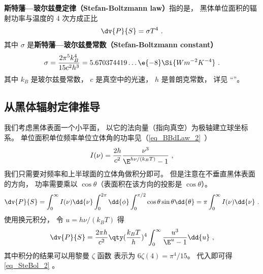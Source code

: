
\textbf{斯特藩—玻尔兹曼定律（Stefan-Boltzmann law）}指的是， 黑体单位面积的辐射功率与温度的 4 次方成正比
\begin{equation}\label{eq_SteBol_2}
\dv{P}{S} = \sigma T^4~.
\end{equation}
其中 $\sigma$ 是\textbf{斯特藩—玻尔兹曼常数（Stefan-Boltzmann constant）}
\begin{equation}
\sigma = \frac{2\pi^5k_B^4}{15c^2h^3} = 5.670374419\dots \e{-8} \Si{Wm^{-2}K^{-4}}~.
\end{equation}
其中 $k_B$ 是玻尔兹曼常数， $c$ 是真空中的光速， $h$ 是普朗克常数， 详见 “”。

\subsection{从黑体辐射定律推导}

我们考虑黑体表面一个小平面， 以它的法向量（指向真空）为极轴建立球坐标系。 单位面积单位频率单位立体角的功率见（\autoref{eq_BBdLaw_2}~）
\begin{equation}\label{eq_SteBol_1}
I(\nu) = \frac{2h}{c^2} \frac{\nu^3}{\E^{h\nu/(k_B T)} - 1}~,
\end{equation}
我们只需要对频率和上半球面的立体角做积分即可。 但是注意在不垂直黑体表面的方向， 功率需要乘以 $\cos\theta$（表面积在该方向的投影是 $\cos\theta$）。
\begin{equation}
\dv{P}{S} = \int_0^\infty I(\nu) \dd{\nu} \int_0^{2\pi} \dd{\phi} \int_0^{\pi/2}\cos\theta\sin\theta\dd{\theta}
= \pi \int_0^\infty I(\nu) \dd{\nu}~.
\end{equation}
使用换元积分， 令 $u = h\nu/(k_BT)$ 得
\begin{equation}
\dv{P}{S} = \frac{2\pi h}{c^2} \qty(\frac{k_B T}{h})^4 \int_0^\infty \frac{u^3}{\E^u - 1}\dd{u}~,
\end{equation}
其中积分的结果可以用黎曼 $\zeta$ 函数%
表示为 $6\zeta(4) = \pi^4/15$。 代入即可得\autoref{eq_SteBol_2} 。%
